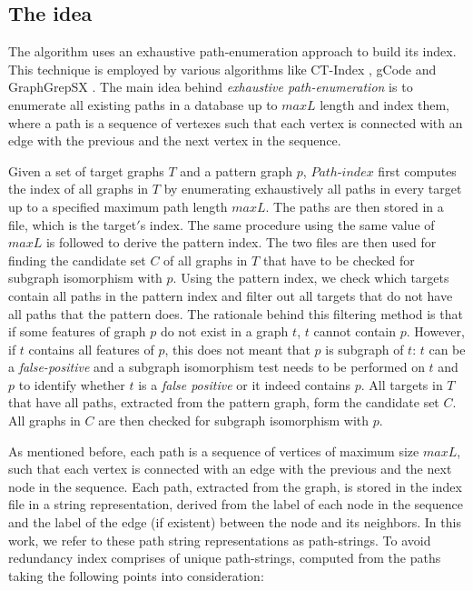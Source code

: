 \documentclass{l4proj}
\theoremstyle{definition}
\begin{document}
\subsection{The idea}
\label{path-index-idea}
    The algorithm uses an exhaustive path-enumeration approach to build its index. This technique is employed by various algorithms like CT-Index \cite{ctindex}, gCode \cite{gcode} and GraphGrepSX \cite{graphgrepsx}. The main idea behind \textit{exhaustive path-enumeration} is to enumerate all existing paths in a database up to $maxL$ length and index them, where a path is a sequence of vertexes such that each vertex is connected with an edge with the previous and the next vertex in the sequence.\par
   Given a set of target graphs $T$ and a pattern graph $p$, $Path$-$index$ first computes the index of all graphs in $T$ by enumerating exhaustively all paths in every target up to a specified maximum path length $maxL$. The paths are then stored in a file, which is the target$'$s index. The same procedure using the same value of $maxL$ is followed to derive the pattern index. The two files are then used for finding the candidate set $C$ of all graphs in $T$ that have to be checked for subgraph isomorphism with $p$. Using the pattern index, we check which targets contain all paths in the pattern index and filter out all targets that do not have all paths that the pattern does. The rationale behind this filtering method is that if some features of graph $p$ do not exist in a graph $t$, $t$ cannot contain $p$. However, if $t$ contains all features of $p$, this does not meant that $p$ is subgraph of $t$: $t$ can be a \textit{false-positive} and a subgraph isomorphism test needs to be performed on $t$ and $p$ to identify whether $t$ is a \textit{false positive} or it indeed contains $p$. All targets in $T$ that have all paths, extracted from the pattern graph, form the candidate set $C$. All graphs in $C$ are then checked for subgraph isomorphism with $p$. \par
As mentioned before, each path is a sequence of vertices of maximum size $maxL$, such that each vertex is connected with an edge with the previous and the next node in the sequence. Each path, extracted from the graph, is stored in the index file in a string representation, derived from the label of each node in the sequence and the label of the edge (if existent) between the node and its neighbors. In this work, we refer to these path string representations as path-strings. To avoid redundancy index comprises of unique path-strings, computed from the paths taking the following points into consideration:
\end{document}
